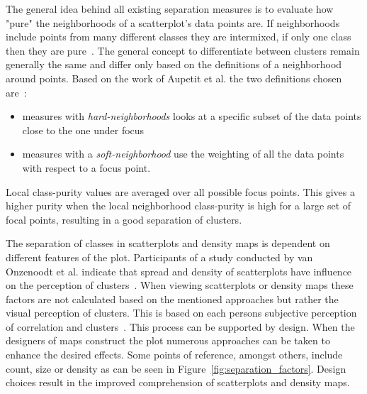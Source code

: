 The general idea behind all existing separation measures is to evaluate how "pure" the neighborhoods of a scatterplot's data points are. If neighborhoods include points from many different classes they are intermixed, if only one class then they are pure~\cite{aupetit2016sepme}.
The general concept to differentiate between clusters remain generally the same and differ only based on the definitions of a neighborhood around points. Based on the work of Aupetit et al. the two definitions chosen are~\cite{aupetit2016sepme}:

\begin{itemize}[leftmargin=*]
	\setlength\itemsep{0.1em}
	\item measures with \textit{hard-neighborhoods} looks at a specific subset of the data points close to the one under focus
	\item measures with a \textit{soft-neighborhood} use the weighting of all the data points with respect to a focus point.
\end{itemize}

Local class-purity values are averaged over all possible focus points. This gives a higher purity when the local neighborhood class-purity is high for a large set of focal points, resulting in a good separation of clusters.

The separation of classes in scatterplots and density maps is dependent on different features of the plot. Participants of a study conducted by van Onzenoodt et al. indicate that spread and density of scatterplots have influence on the perception of clusters~\cite{van2017evaluating}.
When viewing scatterplots or density maps these factors are not calculated based on the mentioned approaches but rather the visual perception of clusters. This is based on each persons subjective perception of correlation and clusters~\cite{rensink2010perception, beyth1982perception, tatu2010visual}. This process can be supported by design. When the designers of maps construct the plot numerous approaches can be taken to enhance the desired effects. Some points of reference, amongst others, include count, size or density as can be seen in Figure~\ref{fig:separation_factors}. Design choices result in the improved comprehension of scatterplots and density maps.

